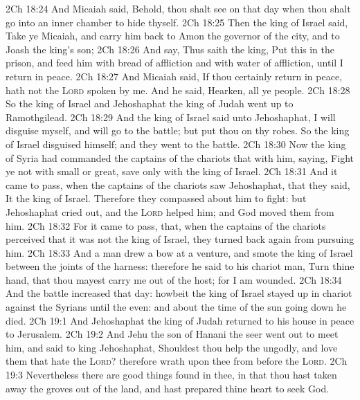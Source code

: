 \vs 2Ch 18:24 And Micaiah said, Behold, thou shalt see on that day when thou shalt go into an inner chamber to hide thyself.
\vs 2Ch 18:25 Then the king of Israel said, Take ye Micaiah, and carry him back to Amon the governor of the city, and to Joash the king's son;
\vs 2Ch 18:26 And say, Thus saith the king, Put this  in the prison, and feed him with bread of affliction and with water of affliction, until I return in peace.
\vs 2Ch 18:27 And Micaiah said, If thou certainly return in peace,  hath not the \textsc{Lord} spoken by me. And he said, Hearken, all ye people.
\vs 2Ch 18:28 So the king of Israel and Jehoshaphat the king of Judah went up to Ramothgilead.
\vs 2Ch 18:29 And the king of Israel said unto Jehoshaphat, I will disguise myself, and will go to the battle; but put thou on thy robes. So the king of Israel disguised himself; and they went to the battle.
\vs 2Ch 18:30 Now the king of Syria had commanded the captains of the chariots that  with him, saying, Fight ye not with small or great, save only with the king of Israel.
\vs 2Ch 18:31 And it came to pass, when the captains of the chariots saw Jehoshaphat, that they said, It  the king of Israel. Therefore they compassed about him to fight: but Jehoshaphat cried out, and the \textsc{Lord} helped him; and God moved them  from him.
\vs 2Ch 18:32 For it came to pass, that, when the captains of the chariots perceived that it was not the king of Israel, they turned back again from pursuing him.
\vs 2Ch 18:33 And a  man drew a bow at a venture, and smote the king of Israel between the joints of the harness: therefore he said to his chariot man, Turn thine hand, that thou mayest carry me out of the host; for I am wounded.
\vs 2Ch 18:34 And the battle increased that day: howbeit the king of Israel stayed  up in  chariot against the Syrians until the even: and about the time of the sun going down he died.
\vs 2Ch 19:1 And Jehoshaphat the king of Judah returned to his house in peace to Jerusalem.
\vs 2Ch 19:2 And Jehu the son of Hanani the seer went out to meet him, and said to king Jehoshaphat, Shouldest thou help the ungodly, and love them that hate the \textsc{Lord}? therefore  wrath upon thee from before the \textsc{Lord}.
\vs 2Ch 19:3 Nevertheless there are good things found in thee, in that thou hast taken away the groves out of the land, and hast prepared thine heart to seek God.
